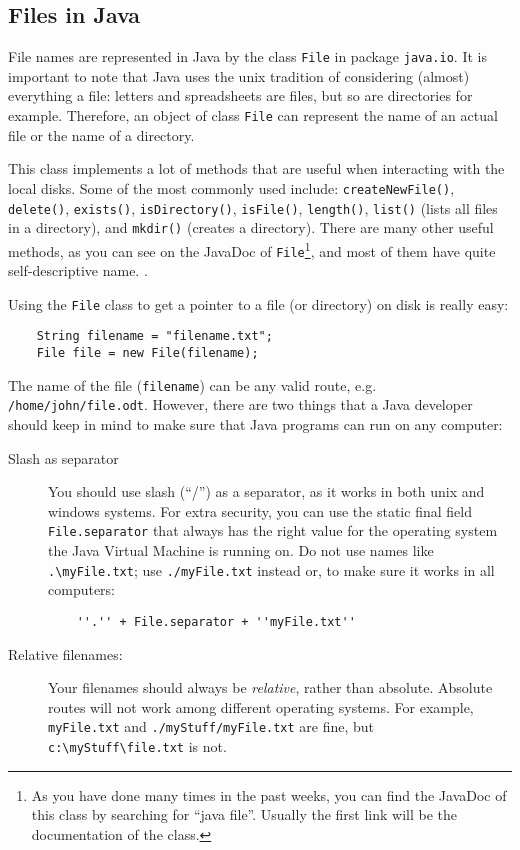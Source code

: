 \subsection{Files in Java}
\label{sec:files-java}

File names are represented in Java by the class \verb+File+ in package
\verb+java.io+. It is important to note that Java uses the unix
tradition of considering (almost) everything a file: letters and
spreadsheets are files, but so are directories for example. Therefore,
an object of class \verb+File+ can represent the name of an actual
file or the name of a directory.

This class implements a lot of methods that are useful when
interacting with the local disks. Some of the most commonly used
include: 
\verb+createNewFile()+, 
\verb+delete()+, 
\verb+exists()+, 
\verb+isDirectory()+, 
\verb+isFile()+, 
\verb+length()+, 
\verb+list()+ (lists all files in a directory), 
and
\verb+mkdir()+ (creates a directory). There are many other useful
methods, as you can see on the JavaDoc of \verb+File+\footnote{As you
  have done many times in the past weeks, you can find the JavaDoc of
  this class by searching for ``java file''. Usually the first link
  will be the documentation of the class. }, and most of them have
quite self-descriptive name. . 

Using the \verb+File+ class to get a pointer to a file (or directory)
on disk is really easy: 

\begin{verbatim}
    String filename = "filename.txt"; 
    File file = new File(filename);
\end{verbatim}

The name of the file (\verb+filename+) can be any valid route,
e.g. \verb+/home/john/file.odt+. However, there are two things that a
Java developer should keep in mind to make sure that Java programs can
run on any computer: 

\begin{description}
\item[Slash as separator] You should use slash (``/'') as a separator,
  as it works in both unix and windows systems. For extra security,
  you can use the static final field \verb+File.separator+ that always
  has the right value for the operating system the Java Virtual
  Machine is running on. Do not use names like \verb+.\myFile.txt+;
  use \verb+./myFile.txt+ instead or, to make sure it works in all
  computers:

\begin{verbatim}
    ''.'' + File.separator + ''myFile.txt''
\end{verbatim}

\item[Relative filenames: ] Your filenames should always be
  \emph{relative}, rather than absolute. Absolute routes will not work
  among different operating systems. For example, \verb+myFile.txt+ and
  \verb+./myStuff/myFile.txt+ are fine, but \verb+c:\myStuff\file.txt+
  is not. 
\end{description}

